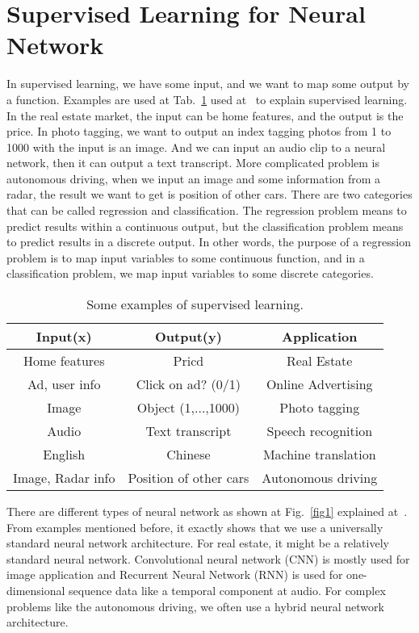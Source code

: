 \documentclass[a4paper]{article}
\begin{document}
\section{Supervised Learning for Neural Network}

In supervised learning, we have some input, and we want to map some output by a function. Examples are used at Tab.~\ref{tab} used at~\cite{Neural} to explain supervised learning. In the real estate market, the input can be home features, and the output is the price. In photo tagging, we want to output an index tagging photos from 1 to 1000 with the input is an image. And we can input an audio clip to a neural network, then it can output a text transcript. More complicated problem is autonomous driving, when we input an image and some information from a radar, the result we want to get is position of other cars. There are two categories that can be called regression and classification. The regression problem means to predict results within a continuous output, but the classification problem means to predict results in a discrete output. In other words, the purpose of a regression problem is to map input variables to some continuous function, and in a classification problem, we map input variables to some discrete categories. 

\begin{table}[hb]
\begin{center}
\begin{tabular}{c|c|c}
  \hline
  Input(x) & Output(y) & Application \\ 
  \hline
  Home features & Pricd & Real Estate \\
  Ad, user info & Click on ad? (0/1) & Online Advertising \\
  Image & Object (1,$\dots$,1000) & Photo tagging \\
  Audio & Text transcript & Speech recognition \\
  English & Chinese & Machine translation \\
  Image, Radar info & Position of other cars & Autonomous driving \\
  \hline
\end{tabular}
\end{center}
\caption{Some examples of supervised learning.}
\label{tab}
\end{table}

There are different types of neural network as shown at Fig.~\ref{fig1} explained at~\cite{Neural}. From examples mentioned before, it exactly shows that we use a universally standard neural network architecture. For real estate, it might be a relatively standard neural network. Convolutional neural network (CNN) is mostly used for image application and Recurrent Neural Network (RNN) is used for one-dimensional sequence data like a temporal component at audio. For complex problems like the autonomous driving, we often use a hybrid neural network architecture. 
\end{document}

